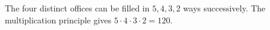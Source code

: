 The four distinct offices can be filled in $5,4,3,2$ ways successively. The multiplication principle gives $5\cdot4\cdot3\cdot2=\boxed{120}$.
